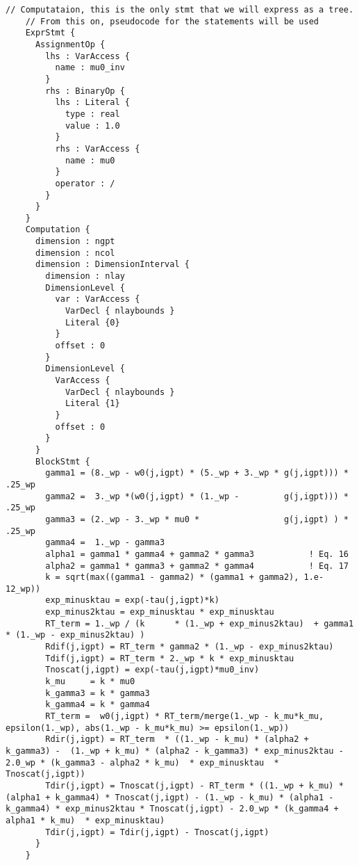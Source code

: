 \begin{lstlisting}[style=default]
    // Computataion, this is the only stmt that we will express as a tree. 
    // From this on, pseudocode for the statements will be used
    ExprStmt { 
      AssignmentOp {
        lhs : VarAccess {
          name : mu0_inv
        }
        rhs : BinaryOp {
          lhs : Literal {
            type : real
            value : 1.0
          }
          rhs : VarAccess {
            name : mu0
          }
          operator : /
        }
      }
    }
    Computation {
      dimension : ngpt
      dimension : ncol
      dimension : DimensionInterval {
        dimension : nlay
        DimensionLevel {
          var : VarAccess { 
            VarDecl { nlaybounds }
            Literal {0}
          }
          offset : 0
        }
        DimensionLevel {
          VarAccess { 
            VarDecl { nlaybounds }
            Literal {1}
          }
          offset : 0
        }
      }
      BlockStmt {
        gamma1 = (8._wp - w0(j,igpt) * (5._wp + 3._wp * g(j,igpt))) * .25_wp
        gamma2 =  3._wp *(w0(j,igpt) * (1._wp -         g(j,igpt))) * .25_wp
        gamma3 = (2._wp - 3._wp * mu0 *                 g(j,igpt) ) * .25_wp
        gamma4 =  1._wp - gamma3
        alpha1 = gamma1 * gamma4 + gamma2 * gamma3           ! Eq. 16
        alpha2 = gamma1 * gamma3 + gamma2 * gamma4           ! Eq. 17
        k = sqrt(max((gamma1 - gamma2) * (gamma1 + gamma2), 1.e-12_wp))
        exp_minusktau = exp(-tau(j,igpt)*k)
        exp_minus2ktau = exp_minusktau * exp_minusktau
        RT_term = 1._wp / (k      * (1._wp + exp_minus2ktau)  + gamma1 * (1._wp - exp_minus2ktau) )
        Rdif(j,igpt) = RT_term * gamma2 * (1._wp - exp_minus2ktau)
        Tdif(j,igpt) = RT_term * 2._wp * k * exp_minusktau
        Tnoscat(j,igpt) = exp(-tau(j,igpt)*mu0_inv)
        k_mu     = k * mu0
        k_gamma3 = k * gamma3
        k_gamma4 = k * gamma4
        RT_term =  w0(j,igpt) * RT_term/merge(1._wp - k_mu*k_mu, epsilon(1._wp), abs(1._wp - k_mu*k_mu) >= epsilon(1._wp))
        Rdir(j,igpt) = RT_term  * ((1._wp - k_mu) * (alpha2 + k_gamma3) -  (1._wp + k_mu) * (alpha2 - k_gamma3) * exp_minus2ktau - 2.0_wp * (k_gamma3 - alpha2 * k_mu)  * exp_minusktau  * Tnoscat(j,igpt))
        Tdir(j,igpt) = Tnoscat(j,igpt) - RT_term * ((1._wp + k_mu) * (alpha1 + k_gamma4) * Tnoscat(j,igpt) - (1._wp - k_mu) * (alpha1 - k_gamma4) * exp_minus2ktau * Tnoscat(j,igpt) - 2.0_wp * (k_gamma4 + alpha1 * k_mu)  * exp_minusktau)
        Tdir(j,igpt) = Tdir(j,igpt) - Tnoscat(j,igpt)
      }   
    }

\end{lstlisting}